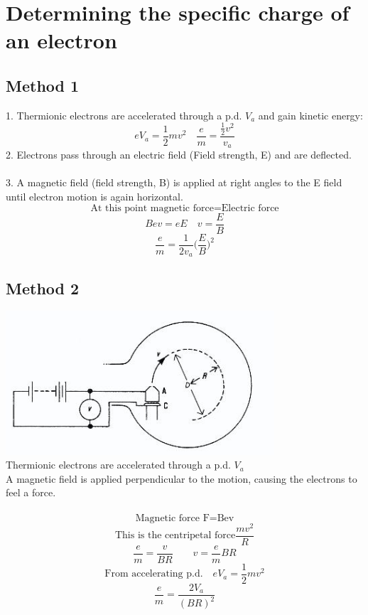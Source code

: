 \documentclass[12pt]{article}
\begin{document}
\section{Determining the specific charge of an electron}
\subsection{Method 1}
1. Thermionic electrons are accelerated through a p.d. $V_a$ and gain kinetic energy:\\
$$eV_a=\frac{1}{2}mv^2 \quad \frac{e}{m}=\frac{\frac{1}{2}v^2}{v_a}$$
2. Electrons pass through an electric field (Field strength, E) and are deflected.\\
\\
3. A magnetic field (field strength, B) is applied at right angles to the E field until electron motion is again horizontal.
$$\textrm{At this point magnetic force=Electric force}$$
$$Bev=eE \quad v=\frac{E}{B}$$
$$\frac{e}{m}=\frac{1}{2v_a}\Bigg(\frac{E}{B}\Bigg)^2$$
\subsection{Method 2}
\includegraphics[width=10cm]{circluar_path.jpg}\\
Thermionic electrons are accelerated through a p.d. $V_a$\\
A magnetic field is applied perpendicular to the motion, causing the electrons to feel a force.\\
\\
$$\textrm{Magnetic force   F=Bev}$$
$$\textrm{This is the centripetal force} \frac{mv^2}{R}$$
$$\frac{e}{m}=\frac{v}{BR} \quad \quad v=\frac{e}{m}BR$$
$$\textrm{From accelerating p.d.}\quad eV_a=\frac{1}{2}mv^2$$
$$\frac{e}{m}=\frac{2V_a}{(BR)^2}$$
\newpage
\end{document}
